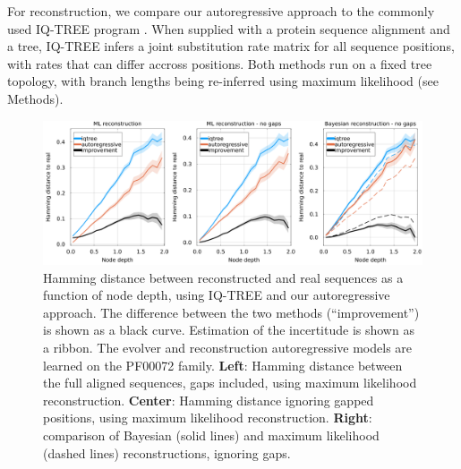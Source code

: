 For reconstruction, we compare our autoregressive approach to the commonly used IQ-TREE program  \cite{minh_iqtreenewmodels_2020}.
When supplied with a protein sequence alignment and a tree, IQ-TREE infers a joint substitution rate matrix for all sequence positions, with rates that can differ accross positions. 
Both methods run on a fixed tree topology, with branch lengths being re-inferred using maximum likelihood (see Methods). \\

\begin{figure}
	\centering
	\includegraphics[width = \textwidth]{figures/hamming_to_real_arnet_PF00072.png}
	\caption{
		Hamming distance between reconstructed and real sequences as a function of node depth, using IQ-TREE and our autoregressive approach. 
		The difference between the two methods (``improvement'') is shown as a black curve. 
		Estimation of the incertitude is shown as a ribbon. 
		The evolver and reconstruction autoregressive models are learned on the PF00072 family. 
		\textbf{Left}: Hamming distance between the full aligned sequences, gaps included, using maximum likelihood reconstruction.  	
		\textbf{Center}: Hamming distance ignoring gapped positions, using maximum likelihood reconstruction. 
		\textbf{Right}: comparison of Bayesian (solid lines) and maximum likelihood (dashed lines) reconstructions, ignoring gaps. 
	}
	\label{fig:hamming_real_arnet}
\end{figure}

